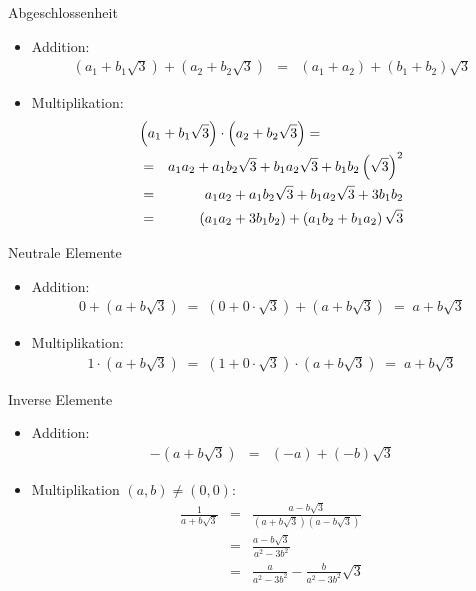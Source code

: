 \documentclass[german]{beamer}
\newcommand{\bq}{\begin{eqnarray*}}
\newcommand{\eq}{\end{eqnarray*}}
\begin{document}
\begin{frame}{Abgeschlossenheit}

\begin{itemize}
\item Addition:
\bq
 \left( a_1 + b_1 \sqrt{3} \right) + \left( a_2 + b_2 \sqrt{3} \right)
 & = &
 \left( a_1 + a_2 \right) + \left( b_1 + b_2 \right) \sqrt{3}
\eq

\item Multiplikation:
\bq
\lefteqn{
 \left( a_1 + b_1 \sqrt{3} \right) \cdot \left( a_2 + b_2 \sqrt{3} \right)
 = } & & \nonumber \\
 & = &
 a_1 a_2 + a_1 b_2 \sqrt{3} + b_1 a_2 \sqrt{3} + b_1 b_2 \left(\sqrt{3}\right)^2
 \nonumber \\
 & = &
 a_1 a_2 + a_1 b_2 \sqrt{3} + b_1 a_2 \sqrt{3} + 3 b_1 b_2
 \nonumber \\
 & = &
 \left( a_1 a_2 + 3 b_1 b_2 \right) + \left( a_1 b_2 + b_1 a_2 \right) \sqrt{3} 
\eq

\end{itemize}

\end{frame}

\begin{frame}{Neutrale Elemente}

\begin{itemize}
\item Addition:
\bq
 0 + \left( a + b \sqrt{3} \right)
 \; = \;
 \left( 0 + 0 \cdot \sqrt{3} \right) + \left( a + b \sqrt{3} \right)
 \; = \;
 a + b \sqrt{3}
\eq

\item Multiplikation:
\bq
 1 \cdot \left( a + b \sqrt{3} \right)
 \; = \;
 \left( 1 + 0 \cdot \sqrt{3} \right) \cdot \left( a + b \sqrt{3} \right)
 \; = \;
 a + b \sqrt{3}
\eq

\end{itemize}

\end{frame}

\begin{frame}{Inverse Elemente}

\begin{itemize}
\item Addition:
\bq
 - \left( a + b \sqrt{3} \right)
 & = &
 \left(-a\right) + \left(-b\right) \sqrt{3}
\eq

\item Multiplikation $(a,b) \neq (0,0)$:
\bq
 \frac{1}{a + b \sqrt{3}}
 & = &
 \frac{a - b \sqrt{3}}{\left(a + b \sqrt{3}\right) \left(a - b \sqrt{3}\right)}
 \nonumber \\
 & = &
 \frac{a - b \sqrt{3}}{a^2 - 3 b^2}
 \nonumber \\
 & = &
 \frac{a}{a^2 - 3 b^2}
 - \frac{b}{a^2 - 3 b^2}  \sqrt{3}
\eq

\end{itemize}

\end{frame}
\end{document}
